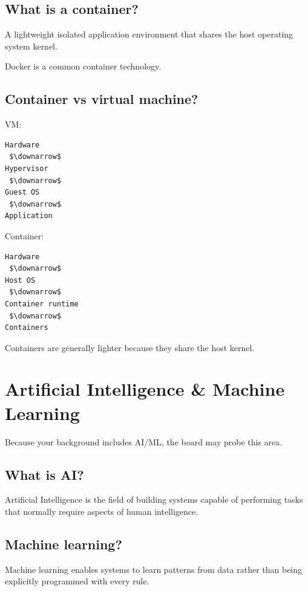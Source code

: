 \medskip

\subsection{What is a container?}

A lightweight isolated application environment that shares the host operating system kernel.

Docker is a common container technology.

\medskip

\subsection{Container vs virtual machine?}

VM:

\begin{lstlisting}
Hardware
 $\downarrow$
Hypervisor
 $\downarrow$
Guest OS
 $\downarrow$
Application
\end{lstlisting}

Container:

\begin{lstlisting}
Hardware
 $\downarrow$
Host OS
 $\downarrow$
Container runtime
 $\downarrow$
Containers
\end{lstlisting}

Containers are generally lighter because they share the host kernel.

\medskip

\section{Artificial Intelligence \& Machine Learning}

Because your background includes AI/ML, the board may probe this area.

\subsection{What is AI?}

Artificial Intelligence is the field of building systems capable of performing tasks that normally require aspects of human intelligence.

\medskip

\subsection{Machine learning?}

Machine learning enables systems to learn patterns from data rather than being explicitly programmed with every rule.

